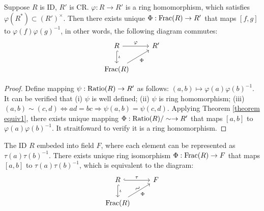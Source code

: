 \begin{proposition}
    \label{proposition 2.2.5}
    Suppose $R$ is ID, $R'$ is CR. $\varphi: R \to R'$ is a ring homomorphism, which satisfies $\varphi(R^*) \subset (R')^{\times}$. Then there exists unique $\Phi: \operatorname{Frac}(R) \to R'$ that maps $[f, g]$ to $\varphi(f)\varphi(g)^{-1}$, in other words, the following diagram commutes:
    \[
        \begin{tikzcd}
            R \arrow[r, "\varphi"]  \arrow[hook, d, "\iota"]
            & R'
            \\
            \Frac(R)  \arrow[ru, "\Phi"']
        \end{tikzcd}
    \]
\end{proposition}
\begin{proof}
    Define mapping $\psi: \operatorname{Ratio}(R) \to R'$ as follows: $(a, b) \mapsto \varphi(a) \varphi(b)^{-1}$. It can be verified that (i) $\psi$ is well defined; (ii) $\psi$ is ring homomorphism; (iii) $(a, b) \sim (c, d) \Leftrightarrow ad = bc \Rightarrow \psi(a, b) = \psi(c, d)$. Applying Theorem \ref{theorem equiv1}, there exists unique mapping $\Phi: \operatorname{Ratio}(R) / \sim \to R'$ that maps $[a, b]$ to $\varphi(a)\varphi(b)^{-1}$. It straitfoward to verify it is a ring homomorphism.
\end{proof}



\begin{corollary}
    The ID $R$ embeded into field $F$, where each element can be represented as $\tau(a) \tau(b)^{-1}$. There exists unique ring isomorphism $\Phi: \operatorname{Frac}(R) \to F$ that maps $[a, b]$ to $\tau(a)\tau(b)^{-1}$, which is equivalent to the diagram:
    \[
        \begin{tikzcd}
            R \arrow[hook, r, "\tau"]  \arrow[hook, d, "\iota"]
            & F
            \\
            \Frac(R)  \arrow[ru, "\Phi"']  \arrow[ru, phantom, sloped, yshift=0.7ex, "\sim"]
        \end{tikzcd}
    \]
\end{corollary}





